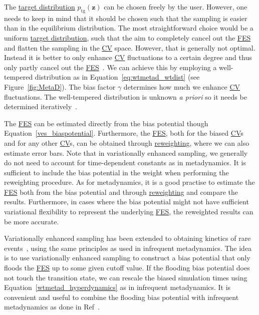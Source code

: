 \documentclass[9pt,review]{livecoms}
\newcommand{\vz}{\mathbf{z}}
\begin{document}
The \hyperlink{ref:targetdist}{target distribution} $p_{\mathrm{tg}}(\vz)$ can be chosen freely by the user. However, one needs to keep in mind that it should be chosen such that the sampling is easier than in the equilibrium distribution. The most straightforward choice would be a uniform \hyperlink{ref:targetdist}{target distribution}, such that the aim to completely cancel out the \hyperlink{ref:FES} {FES} and flatten the sampling in the \hyperlink{ref:CV} {CV} space. However, that is generally not optimal. Instead it is better to only enhance \hyperlink{ref:CV} {CV} fluctuations to a certain degree and thus only partly cancel out the \hyperlink{ref:FES} {FES}~\cite{Valsson-JCTC-2015}. We can achieve this by employing a well-tempered distribution as in Equation~\ref{eq:wtmetad_wtdist} (see Figure~\ref{fig:MetaD}). The bias factor $\gamma$ determines how much we enhance \hyperlink{ref:CV} {CV} fluctuations. The well-tempered distribution is unknown \textit{a priori} so it needs be determined iteratively~\cite{Valsson-JCTC-2015}.

The \hyperlink{ref:FES} {FES} can be estimated directly from the bias potential though Equation~\ref{ves_biaspotential}. Furthermore, the \hyperlink{ref:FES} {FES}, both for the biased \hyperlink{ref:CV} {CV}s and for any other \hyperlink{ref:CV} {CV}s, can be obtained through \hyperlink{ref:Reweighting} {reweighting}, where we can also estimate error bars. Note that  in variationally enhanced sampling, we generally do not need to account for time-dependent constants as in metadynamics. It is sufficient to include the bias potential in the weight when performing the reweighting procedure. As for metadynamics, it is a good practise to estimate the \hyperlink{ref:FES} {FES} both from the bias potential and through \hyperlink{ref:Reweighting} {reweighting} and compare the results. Furthermore, in cases where the bias potential might not have sufficient variational flexibility to represent the underlying \hyperlink{ref:FES} {FES}, the reweighted results can be more accurate.

Variationally enhanced sampling has been extended to obtaining kinetics of rare events~\cite{McCarty-PRL-2015}, using the same principles as used in infrequent metadynamics. The idea is to use variationally enhanced sampling to construct a bias potential that only floods the \hyperlink{ref:FES} {FES} up to some given cutoff value. If the flooding bias potential does not touch the transition state, we can rescale the biased simulation times using Equation~\ref{wtmetad_hyperdynamics} as in infrequent metadynamics. It is convenient and useful to combine the flooding bias potential with infrequent metadynamics as done in Ref~\cite{Palazzesi2017_JPCL}.
\end{document}

